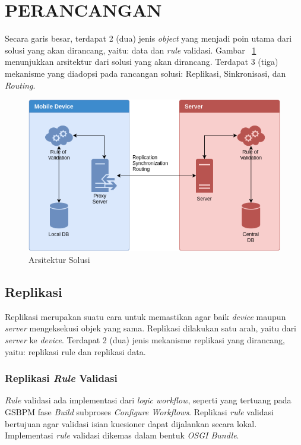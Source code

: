 \section{PERANCANGAN}

Secara garis besar, terdapat 2 (dua) jenis \textit{object} yang menjadi poin utama dari solusi yang akan dirancang, yaitu: data dan \textit{rule} validasi. Gambar ~\ref{fig:architecture-solution} menunjukkan arsitektur dari solusi yang akan dirancang. Terdapat 3 (tiga) mekanisme yang diadopsi pada rancangan solusi: Replikasi, Sinkronisasi, dan  \textit{Routing}.

\begin{figure}[h]
    \centering
    \includegraphics[width=.87\textwidth]{../../Resources/Images/architecture-solution}
    \caption{Arsitektur Solusi}
    \label{fig:architecture-solution}
\end{figure}


\subsection{Replikasi}

Replikasi merupakan suatu cara untuk memastikan agar baik \textit{device} maupun \textit{server} mengeksekusi objek yang sama. Replikasi dilakukan satu arah, yaitu dari \textit{server} ke \textit{device}. Terdapat 2 (dua) jenis mekanisme replikasi yang dirancang, yaitu: replikasi rule dan replikasi data.


\subsubsection{Replikasi \textit{Rule} Validasi}

\textit{Rule} validasi ada implementasi dari \textit{logic workflow}, seperti yang tertuang pada GSBPM fase \textit{Build} subproses \textit{Configure Workflows}. Replikasi \textit{rule} validasi bertujuan agar validasi isian kuesioner dapat dijalankan secara lokal. Implementasi \textit{rule} validasi dikemas dalam bentuk \textit{OSGI Bundle}.


